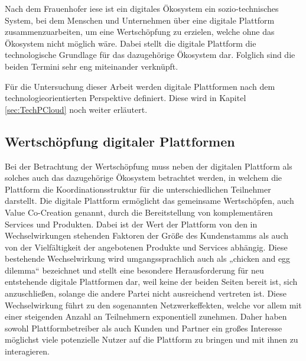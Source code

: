 Nach dem Frauenhofer \ac{iese} ist ein digitales Ökosystem ein sozio-technisches System, bei dem Menschen und Unternehmen über eine digitale Plattform zusammenzuarbeiten, um eine Wertschöpfung zu erzielen, welche ohne das Ökosystem nicht möglich wäre. \autocite[Vgl.][S. 376]{MULLERSTEWENS2019} Dabei stellt die digitale Plattform die technologische Grundlage für das dazugehörige Ökosystem dar. \autocite[Vgl.][S. 376]{IESE2021} Folglich sind die beiden Termini sehr eng miteinander verknüpft.

Für die Untersuchung dieser Arbeit werden digitale Plattformen nach dem technologieorientierten Perspektive definiert. Diese wird in Kapitel \ref{sec:TechPCloud} noch weiter erläutert. 




\subsection{Wertschöpfung digitaler Plattformen}

Bei der Betrachtung der Wertschöpfung muss neben der digitalen Plattform als solches auch das dazugehörige Ökosystem betrachtet werden, in welchem die Plattform die Koordinationsstruktur für die unterschiedlichen Teilnehmer darstellt. Die digitale Plattform ermöglicht das gemeinsame Wertschöpfen, auch Value Co-Creation genannt, durch die Bereitstellung von komplementären Services und Produkten. Dabei ist der Wert der Plattform von den in Wechselwirkungen stehenden Faktoren der Größe des Kundenstamms als auch von der Vielfältigkeit der angebotenen Produkte und Services abhängig. Diese bestehende Wechselwirkung wird umgangssprachlich auch als „chicken and egg dilemma“ bezeichnet und stellt eine besondere Herausforderung für neu entstehende digitale Plattformen dar, weil keine der beiden Seiten bereit ist, sich anzuschließen, solange die andere Partei nicht ausreichend vertreten ist. \autocite[Vgl.][S. 310]{CAILLAUD2003} 
Diese Wechselwirkung führt zu den sogenannten Netzwerkeffekten, welche vor allem mit einer steigenden Anzahl an Teilnehmern exponentiell zunehmen. Daher haben sowohl Plattformbetreiber als auch Kunden und Partner ein großes Interesse möglichst viele potenzielle Nutzer auf die Plattform zu bringen und mit ihnen zu interagieren. \autocite[Vgl.][S. 596-600]{HAHN2016} 

